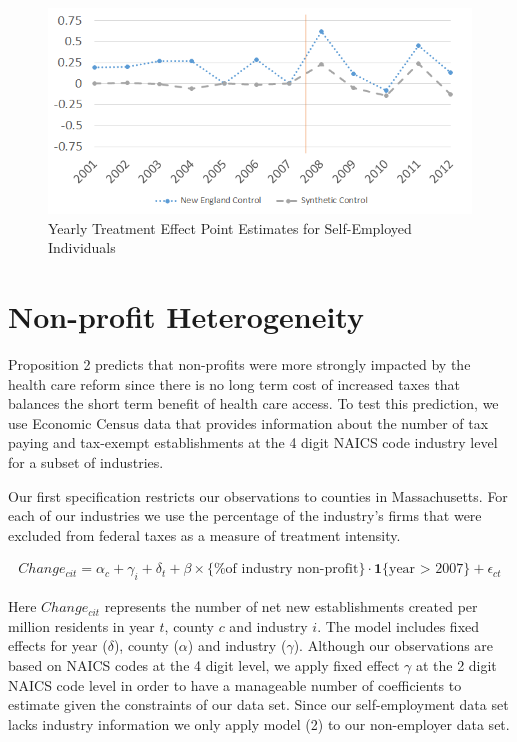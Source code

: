 \begin{figure}[h]
	\centering
	\includegraphics[scale=0.6]{resources/ne_synth.png}
	\caption{Yearly Treatment Effect Point Estimates for Self-Employed Individuals}
	\label{fig:state_contrast}
\end{figure}

\section{Non-profit Heterogeneity}

Proposition 2 predicts that non-profits were more strongly impacted by the health care reform since there is no long term cost of increased taxes that balances the short term benefit of health care access. To test this prediction, we use Economic Census data that provides information about the number of tax paying and tax-exempt establishments at the 4 digit NAICS code industry level for a subset of industries.  

Our first specification restricts our observations to counties in Massachusetts. For each of our industries we use the percentage of the industry's firms that were excluded from federal taxes as a measure of treatment intensity. 

\begin{align}
Change_{cit} = \alpha_c + \gamma_i + \delta_t + \beta \times \{\text{\% of industry non-profit}\} \cdot \mathbf{1}\{\text{year > 2007}\} + \epsilon_{ct}
\end{align}

Here $Change_{cit}$ represents the number of net new establishments created per million residents in year $t$, county $c$ and industry $i$. The model includes fixed effects for year ($\delta$), county ($\alpha$) and industry ($\gamma$). Although our observations are based on NAICS codes at the 4 digit level, we apply fixed effect $\gamma$ at the 2 digit NAICS code level in order to have a manageable number of coefficients to estimate given the constraints of our data set. Since our self-employment data set lacks industry information we only apply model (2) to our non-employer data set. 

